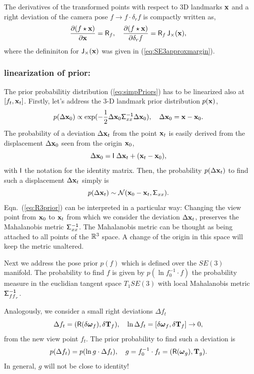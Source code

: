 \documentclass[conference]{IEEEtran}
\newcommand{\real}{\Bbb R}
\newcommand{\bfomega}{\boldsymbol{\omega}}
\newcommand{\sigmaff}{\mathsf{\Sigma^{-1}_\mathnormal{{ff}_r}}}
\newcommand{\sigmaxx}{\mathsf{\Sigma^{-1}_\mathnormal{xx}}}
\newcommand{\beq}{\begin{equation}}
\newcommand{\eeq}{\end{equation}}
\begin{document}
The derivatives of the transformed points with respect to 3D landmarks ${\bf x}$ and a right deviation of
the camera pose $f\rightarrow f\cdot\delta_rf$ is compactly written as,
\beq
    {\partial(f\star{\bf x})\over \partial {\bf x}} = {\sf R}_f,\quad
    {\partial(f\star{\bf x})\over \partial {\delta_r f}} = {\sf R}_f \,
    {\sf J_\times}({\bf x}),
\eeq
where the defininiton for ${\sf J_\times}({\bf x})$ was given in (\ref{eq:SE3approxmargin}).

\subsubsection{linearization of prior:}

The prior probabilitiy distribution (\ref{eq:simpPriors}) has to be linearized also at $[f_t,{\bf x}_t]$.
Firstly, let's address the 3-D landmark prior distribution $p({\bf x})$,
\beq
    p(\Delta {\bf x}_0) \propto \exp( -{1\over 2} \Delta {\bf x}_0 \sigmaxx  \Delta {\bf x}_0),
    \quad \Delta{\bf x}_0 = {\bf x}-{\bf x}_0.
\eeq
The probability of a deviation $\Delta {\bf x}_t$ from the point ${\bf x}_t$ is easily derived 
from the displacement $\Delta{\bf x}_0$ seen from the origin ${\bf x}_0$,
\beq
    \Delta {\bf x}_0 = {\sf I} \; \Delta {\bf x}_t + ({\bf x}_t-{\bf x}_0), \label{eq:translation}
\eeq
with ${\sf I}$ the notation for the identity matrix.
Then, the probability $p(\Delta {\bf x}_t)$ to find such a displacement $\Delta{\bf x}_t$ simply is
\beq
    p(\Delta {\bf x}_t) \sim {\cal N}({\bf x}_0-{\bf x}_t,\mathsf{\Sigma}_{xx}).
    \label{eq:R3prior}
\eeq
Eqn.~(\ref{eq:R3prior}) can be interpreted in a particular way:
Changing the view point from ${\bf x}_0$ to ${\bf x}_t$ from which we consider the deviation $\Delta {\bf x}_t$,
preserves the Mahalanobis metric $\sigmaxx$. The Mahalanobis metric can be thought as being attached to all points of
the $\real^3$ space. A change of the origin in this space will keep the metric unaltered.

Next we address the pose prior $p(f)$ which is defined over the $SE(3)$ manifold. The probability to find
$f$ is given by $p(\ln f_0^{-1}\cdot f)$ the probability measure in the euclidian tangent space $T_1SE(3)$
with local Mahalanobis  metric $\sigmaff$.

Analogously, we consider a small right deviations $\Delta f_t$
\beq
    \Delta f_t = ({\sf R}(\delta\bfomega_f),\delta {\bf T}_f), \quad
    \ln \Delta f_t = [\delta\bfomega_f,\delta{\bf T}_f]\rightarrow 0, \label{eq:smalldevlimit}
\eeq
from the new view point $f_t$. The prior probability to find such a deviation is
\beq
    p(\Delta f_t) = p(\ln g \cdot \Delta f_t),\quad
    g=f_0^{-1}\cdot f_t = ({\sf R}(\bfomega_g),{\bf T}_g).
    \label{eq:SE3prior}
\eeq
In general, $g$ will not be close to identity!
\end{document}
